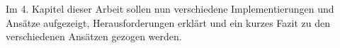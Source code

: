 Im 4. Kapitel dieser Arbeit sollen nun verschiedene Implementierungen und Ansätze aufgezeigt, Herausforderungen erklärt und ein kurzes Fazit zu den verschiedenen Ansätzen gezogen werden. 